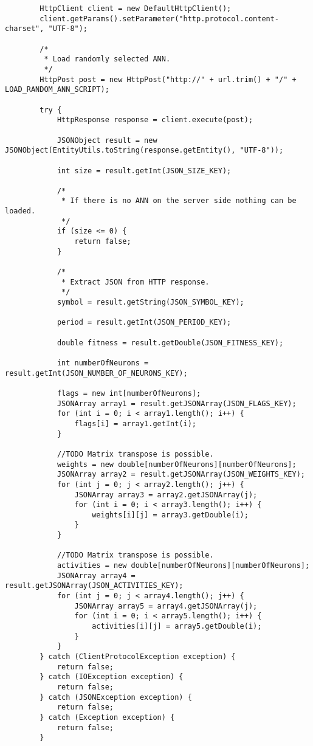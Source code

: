 \begin{verbatim}
        HttpClient client = new DefaultHttpClient();
        client.getParams().setParameter("http.protocol.content-charset", "UTF-8");

        /*
         * Load randomly selected ANN.
         */
        HttpPost post = new HttpPost("http://" + url.trim() + "/" + LOAD_RANDOM_ANN_SCRIPT);

        try {
            HttpResponse response = client.execute(post);

            JSONObject result = new JSONObject(EntityUtils.toString(response.getEntity(), "UTF-8"));

            int size = result.getInt(JSON_SIZE_KEY);

            /*
             * If there is no ANN on the server side nothing can be loaded.
             */
            if (size <= 0) {
                return false;
            }

            /*
             * Extract JSON from HTTP response.
             */
            symbol = result.getString(JSON_SYMBOL_KEY);

            period = result.getInt(JSON_PERIOD_KEY);

            double fitness = result.getDouble(JSON_FITNESS_KEY);

            int numberOfNeurons = result.getInt(JSON_NUMBER_OF_NEURONS_KEY);

            flags = new int[numberOfNeurons];
            JSONArray array1 = result.getJSONArray(JSON_FLAGS_KEY);
            for (int i = 0; i < array1.length(); i++) {
                flags[i] = array1.getInt(i);
            }

            //TODO Matrix transpose is possible.
            weights = new double[numberOfNeurons][numberOfNeurons];
            JSONArray array2 = result.getJSONArray(JSON_WEIGHTS_KEY);
            for (int j = 0; j < array2.length(); j++) {
                JSONArray array3 = array2.getJSONArray(j);
                for (int i = 0; i < array3.length(); i++) {
                    weights[i][j] = array3.getDouble(i);
                }
            }

            //TODO Matrix transpose is possible.
            activities = new double[numberOfNeurons][numberOfNeurons];
            JSONArray array4 = result.getJSONArray(JSON_ACTIVITIES_KEY);
            for (int j = 0; j < array4.length(); j++) {
                JSONArray array5 = array4.getJSONArray(j);
                for (int i = 0; i < array5.length(); i++) {
                    activities[i][j] = array5.getDouble(i);
                }
            }
        } catch (ClientProtocolException exception) {
            return false;
        } catch (IOException exception) {
            return false;
        } catch (JSONException exception) {
            return false;
        } catch (Exception exception) {
            return false;
        }


\end{verbatim}
